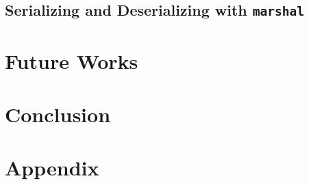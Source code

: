 \documentclass[sigconf]{acmart}
\begin{document}
\subsection{Serializing and Deserializing with \texttt{marshal}}

\section{Future Works}

\section{Conclusion}

\section{Appendix}



\end{document}
